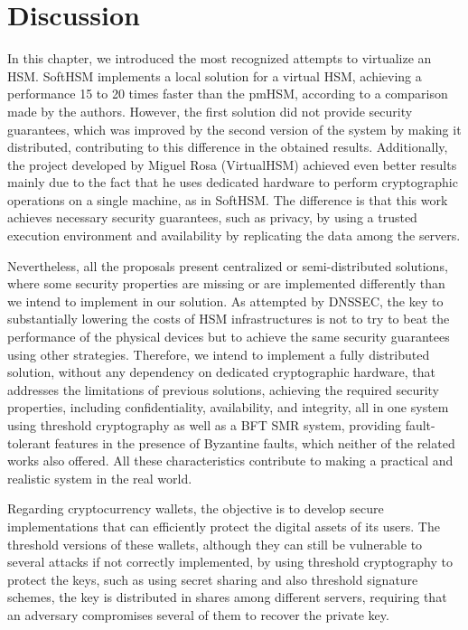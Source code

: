 \section{Discussion} \label{sec:relatedwork-discussion}

In this chapter, we introduced the most recognized attempts to virtualize an HSM. SoftHSM implements a local solution for a virtual HSM, achieving a performance 15 to 20 times faster than the pmHSM, according to a comparison made by the authors. However, the first solution did not provide security guarantees, which was improved by the second version of the system by making it distributed, contributing to this difference in the obtained results. Additionally, the project developed by Miguel Rosa (VirtualHSM) achieved even better results mainly due to the fact that he uses dedicated hardware to perform cryptographic operations on a single machine, as in SoftHSM. The difference is that this work achieves necessary security guarantees, such as privacy, by using a trusted execution environment and availability by replicating the data among the servers.

Nevertheless, all the proposals present centralized or semi-distributed solutions, where some security properties are missing or are implemented differently than we intend to implement in our solution. As attempted by DNSSEC, the key to substantially lowering the costs of HSM infrastructures is not to try to beat the performance of the physical devices but to achieve the same security guarantees using other strategies. Therefore, we intend to implement a fully distributed solution, without any dependency on dedicated cryptographic hardware, that addresses the limitations of previous solutions, achieving the required security properties, including confidentiality, availability, and integrity, all in one system using threshold cryptography as well as a BFT SMR system, providing fault-tolerant features in the presence of Byzantine faults, which neither of the related works also offered. All these characteristics contribute to making a practical and realistic system in the real world.

Regarding cryptocurrency wallets, the objective is to develop secure implementations that can efficiently protect the digital assets of its users. The threshold versions of these wallets, although they can still be vulnerable to several attacks \cite{attackingthresholdwallets} if not correctly implemented, by using threshold cryptography to protect the keys, such as using secret sharing and also threshold signature schemes, the key is distributed in shares among different servers, requiring that an adversary compromises several of them to recover the private key.

